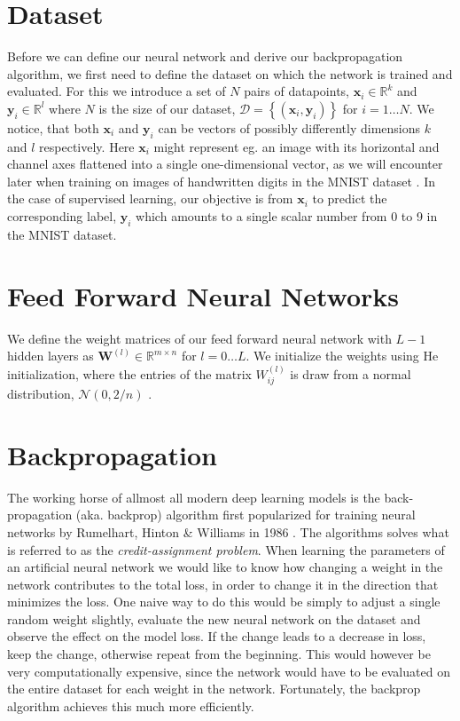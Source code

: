 \documentclass[a4paper,twoside,11pt]{report} %
\begin{document}
\section{Dataset}
Before we can define our neural network and derive our backpropagation algorithm, we first need to define the dataset on which the network is trained and evaluated. For this we introduce a set of $N$ pairs of datapoints, $\mathbf{x}_i \in \mathbb{R}^k$ and $\mathbf{y}_i \in \mathbb{R}^l$ where $N$ is the size of our dataset, $\mathcal{D} = \left\{(\mathbf{x}_i, \mathbf{y}_i)\right\}$ for $i = 1 \ldots N$. We notice, that both $\mathbf{x}_i$ and $\mathbf{y}_i$ can be vectors of possibly differently dimensions $k$ and $l$ respectively. Here $\mathbf{x}_i$ might represent eg. an image with its horizontal and channel axes flattened into a single one-dimensional vector, as we will encounter later when training on images of handwritten digits in the MNIST dataset \cite{mnist}. In the case of supervised learning, our objective is from $\mathbf{x}_i$ to predict the corresponding label, $\mathbf{y}_i$ which amounts to a single scalar number from 0 to 9 in the MNIST dataset. 

\section{Feed Forward Neural Networks}
We define the weight matrices of our feed forward neural network with $L-1$ hidden layers as $\mathbf{W}^{(l)} \in \mathbb{R}^{m \times n}$ for $l = 0 \ldots L$. We initialize the weights using He initialization, where the entries of the matrix $W^{(l)}_{ij}$ is draw from a normal distribution, $\mathcal{N}(0, 2/n)$ \cite{he2015delving}. 

\section{Backpropagation}
The working horse of allmost all modern deep learning models is the back-propagation (aka. backprop) algorithm first popularized for training neural networks by Rumelhart, Hinton \& Williams in 1986 \cite{rumelhart1986learning}. The algorithms solves what is referred to as the \textit{credit-assignment problem}. When learning the parameters of an artificial neural network we would like to know how changing a weight in the network contributes to the total loss, in order to change it in the direction that minimizes the loss. One naive way to do this would be simply to adjust a single random weight slightly, evaluate the new neural network on the dataset and observe the effect on the model loss. If the change leads to a decrease in loss, keep the change, otherwise repeat from the beginning. This would however be very computationally expensive, since the network would have to be evaluated on the entire dataset for each weight in the network. Fortunately, the backprop algorithm achieves this much more efficiently. \\
\\
\end{document}
